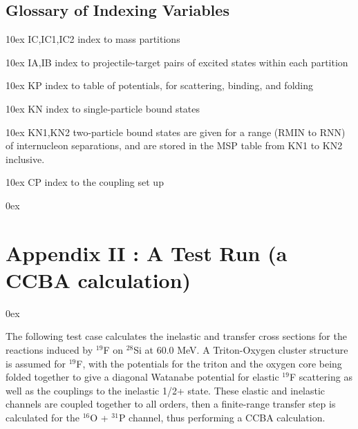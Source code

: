 \documentclass[11pt]{article}
\begin{document}
\bigskip
\subsection*{Glossary of Indexing Variables}
%

\hangindent 10ex
IC,IC1,IC2    index to mass partitions

\hangindent 10ex
IA,IB         index to projectile-target pairs of excited states
              within each partition

\hangindent 10ex
KP            index to table of potentials, for scattering, binding,
              and folding

\hangindent 10ex
KN            index to single-particle bound states

\hangindent 10ex
KN1,KN2       two-particle bound states are given for a range (RMIN to
              RNN) of internucleon separations, and are stored in the
              MSP table from KN1 to KN2 inclusive.

\hangindent 10ex
CP            index to the coupling set up

\hangindent 0ex

\newpage
\section*{Appendix II : A Test Run (a CCBA calculation)}

\hangindent 0ex


The following test case calculates the inelastic and transfer cross sections
for the reactions induced by $^{19}$F on $^{28}$Si at 60.0 MeV.   A Triton-Oxygen
cluster structure is assumed for $^{19}$F, with the potentials for the triton
and the oxygen core being folded together to give a diagonal Watanabe
potential for elastic $^{19}$F scattering as well as the couplings to the
inelastic 1/2+ state.
These elastic and inelastic channels are coupled together to all orders,
then a finite-range transfer step is calculated for the $^{16}$O + $^{31}$P channel,
thus performing a CCBA calculation.
\end{document}
